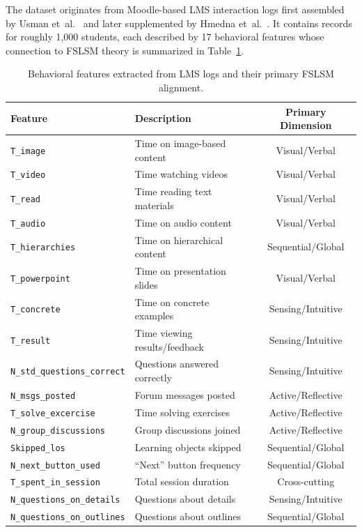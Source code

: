 \documentclass[journal, onecolumn]{IEEEtran}
\begin{document}
The dataset originates from Moodle-based LMS interaction logs first assembled by Usman et~al.~\cite{usman2023github} and later supplemented by Hmedna et~al.~\cite{hmedna2019github}. It contains records for roughly 1{,}000 students, each described by 17 behavioral features whose connection to FSLSM theory is summarized in Table~\ref{tab:features}.

\begin{table}[!htbp]
\centering
\small
\caption{Behavioral features extracted from LMS logs and their primary FSLSM alignment.}
\label{tab:features}
\begin{tabular}{@{}llc@{}}
\toprule
\textbf{Feature} & \textbf{Description} & \textbf{Primary Dimension} \\
\midrule
\texttt{T\_image} & Time on image-based content & Visual/Verbal \\
\texttt{T\_video} & Time watching videos & Visual/Verbal \\
\texttt{T\_read} & Time reading text materials & Visual/Verbal \\
\texttt{T\_audio} & Time on audio content & Visual/Verbal \\
\texttt{T\_hierarchies} & Time on hierarchical content & Sequential/Global \\
\texttt{T\_powerpoint} & Time on presentation slides & Visual/Verbal \\
\texttt{T\_concrete} & Time on concrete examples & Sensing/Intuitive \\
\texttt{T\_result} & Time viewing results/feedback & Sensing/Intuitive \\
\texttt{N\_std\_questions\_correct} & Questions answered correctly & Sensing/Intuitive \\
\texttt{N\_msgs\_posted} & Forum messages posted & Active/Reflective \\
\texttt{T\_solve\_excercise} & Time solving exercises & Active/Reflective \\
\texttt{N\_group\_discussions} & Group discussions joined & Active/Reflective \\
\texttt{Skipped\_los} & Learning objects skipped & Sequential/Global \\
\texttt{N\_next\_button\_used} & ``Next'' button frequency & Sequential/Global \\
\texttt{T\_spent\_in\_session} & Total session duration & Cross-cutting \\
\texttt{N\_questions\_on\_details} & Questions about details & Sensing/Intuitive \\
\texttt{N\_questions\_on\_outlines} & Questions about outlines & Sequential/Global \\
\bottomrule
\end{tabular}
\end{table}
\end{document}
